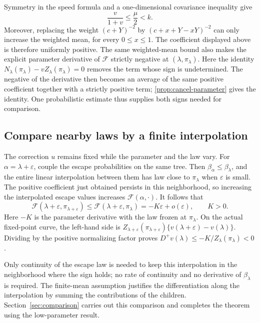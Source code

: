 \documentclass[11pt,a4paper]{article}
\numberwithin{equation}{section}
\theoremstyle{notethm}
\theoremstyle{definition}
\newcommand{\Dplus}{D^{+}}
\newcommand{\cF}{\mathscr F}
\begin{document}
Symmetry in the speed formula and a one-dimensional covariance inequality
give
\[
 \frac{v}{1+v}\le\frac{\mu}{2}<k.
\]
Moreover, replacing the weight $(c+Y)^{-2}$ by
$(c+x+Y-xY)^{-2}$ can only increase the weighted mean, for every
$0\le x\le1$. The coefficient displayed above is therefore uniformly
positive. The same weighted-mean bound also makes the explicit parameter
derivative of $\cF$ strictly negative at $(\lambda,\pi_\lambda)$.
Here the identity $N_\lambda(\pi_\lambda)-vZ_\lambda(\pi_\lambda)=0$
removes the term whose sign is undetermined. The negative of the derivative
then becomes an average of the same positive coefficient together with
a strictly positive term; \cref{prop:cancel-parameter} gives the identity.
One probabilistic estimate thus supplies both signs needed for comparison.

\subsection{Compare nearby laws by a finite interpolation}

The correction $u$ remains fixed while the parameter and the law vary.
For $\alpha=\lambda+\varepsilon$, couple the escape probabilities on
the same tree. Then $\beta_\alpha\le\beta_\lambda$, and the entire
linear interpolation between them has law close to $\pi_\lambda$ when
$\varepsilon$ is small. The positive coefficient just obtained persists
in this neighborhood, so increasing the interpolated escape values
increases $\cF(\alpha,\cdot)$. It follows that
\begin{equation}\label{eq:roadmap-comparison}
 \cF(\lambda+\varepsilon,\pi_{\lambda+\varepsilon})
 \le\cF(\lambda+\varepsilon,\pi_\lambda)
 =-K\varepsilon+o(\varepsilon),
 \qquad K>0.
\end{equation}
Here $-K$ is the parameter derivative with the law frozen at
$\pi_\lambda$. On the actual fixed-point curve, the left-hand side is
$Z_{\lambda+\varepsilon}(\pi_{\lambda+\varepsilon})
\{v(\lambda+\varepsilon)-v(\lambda)\}$.
Dividing by the positive normalizing factor proves
$\Dplus v(\lambda)\le-K/Z_\lambda(\pi_\lambda)<0$.

Only continuity of the escape law is needed to keep this interpolation
in the neighborhood where the sign holds; no rate of continuity and no
derivative of $\beta_\lambda$ is required. The finite-mean assumption
justifies the differentiation along the interpolation by summing the
contributions of the children. Section~\ref{sec:comparison} carries out
this comparison and completes the theorem using the low-parameter result.
\end{document}

